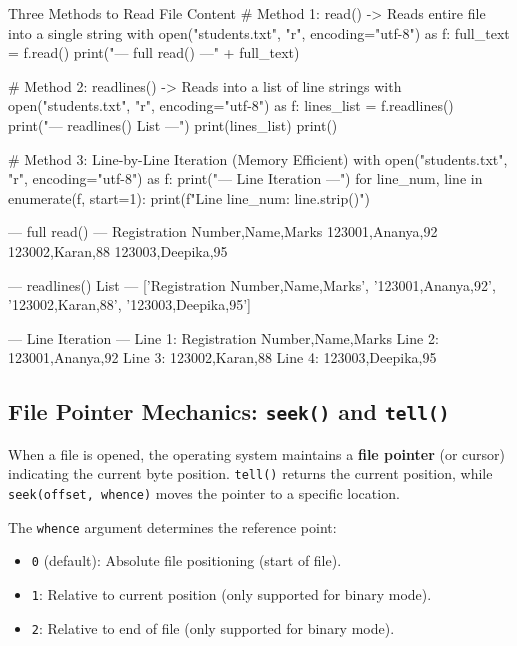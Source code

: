 \begin{pythoncode}{Three Methods to Read File Content}
# Method 1: read() -> Reads entire file into a single string
with open("students.txt", "r", encoding="utf-8") as f:
    full_text = f.read()
    print("--- full read() ---\n" + full_text)

# Method 2: readlines() -> Reads into a list of line strings
with open("students.txt", "r", encoding="utf-8") as f:
    lines_list = f.readlines()
    print("--- readlines() List ---")
    print(lines_list)
    print()

# Method 3: Line-by-Line Iteration (Memory Efficient)
with open("students.txt", "r", encoding="utf-8") as f:
    print("--- Line Iteration ---")
    for line_num, line in enumerate(f, start=1):
        print(f"Line {line_num}: {line.strip()}")
\end{pythoncode}
\begin{outputbox}
--- full read() ---
Registration Number,Name,Marks
123001,Ananya,92
123002,Karan,88
123003,Deepika,95

--- readlines() List ---
['Registration Number,Name,Marks\n', '123001,Ananya,92\n', '123002,Karan,88\n', '123003,Deepika,95\n']

--- Line Iteration ---
Line 1: Registration Number,Name,Marks
Line 2: 123001,Ananya,92
Line 3: 123002,Karan,88
Line 4: 123003,Deepika,95
\end{outputbox}

\subsection{File Pointer Mechanics: \texttt{seek()} and \texttt{tell()}}

When a file is opened, the operating system maintains a \textbf{file pointer} (or cursor) indicating the current byte position. \texttt{tell()} returns the current position, while \texttt{seek(offset, whence)} moves the pointer to a specific location.

The \texttt{whence} argument determines the reference point:
\begin{itemize}[leftmargin=1.5em]
    \item \texttt{0} (default): Absolute file positioning (start of file).
    \item \texttt{1}: Relative to current position (only supported for binary mode).
    \item \texttt{2}: Relative to end of file (only supported for binary mode).
\end{itemize}

